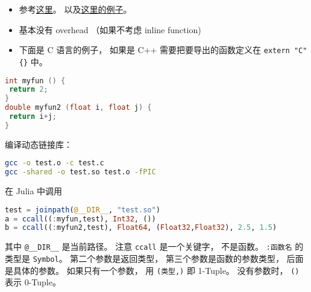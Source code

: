 
\begin{issues}
\issueDraft
\end{issues}

\begin{itemize}
\item 参考\href{https://docs.julialang.org/en/v1/manual/calling-c-and-fortran-code/}{这里}。 以及\href{https://discourse.julialang.org/t/how-to-make-julia-call-c-c-coded-function/54780/5}{这里的例子}。
\item 基本没有 overhead （如果不考虑 inline function)
\item 下面是 C 语言的例子， 如果是 C++ 需要把要导出的函数定义在 \verb|extern "C" {}| 中。
\end{itemize}

\begin{lstlisting}[language=cpp]
int myfun () {
 return 2;
}
double myfun2 (float i, float j) {
 return i+j;
}
\end{lstlisting}

编译动态链接库：
\begin{lstlisting}[language=bash]
gcc -o test.o -c test.c
gcc -shared -o test.so test.o -fPIC
\end{lstlisting}

在 Julia 中调用
\begin{lstlisting}[language=julia]
test = joinpath(@__DIR__, "test.so")
a = ccall((:myfun,test), Int32, ())
b = ccall((:myfun2,test), Float64, (Float32,Float32), 2.5, 1.5)
\end{lstlisting}
其中 \verb|@__DIR__| 是当前路径。 注意 \verb|ccall| 是一个关键字， 不是函数。 \verb|:函数名| 的类型是 \verb|Symbol|。 第二个参数是返回类型， 第三个参数是函数的参数类型， 后面是具体的参数。 如果只有一个参数， 用 \verb|(类型,)| 即 1-Tuple。 没有参数时， \verb|()| 表示 0-Tuple。
